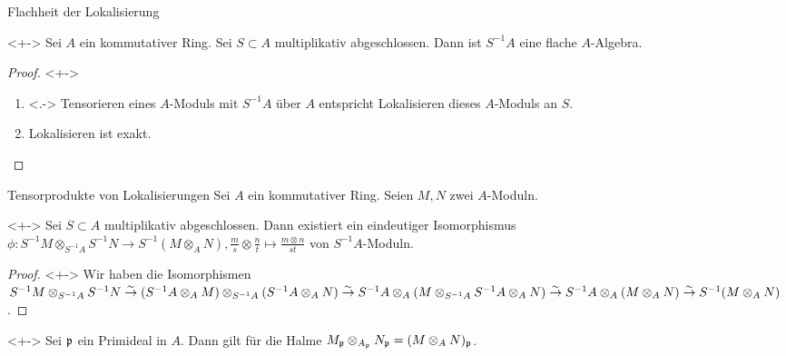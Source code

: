 \begin{frame}{Flachheit der Lokalisierung}
	\begin{proposition}<+->
		Sei \(A\) ein kommutativer Ring. Sei \(S \subset A\) multiplikativ abgeschlossen. Dann ist
		\(S^{-1} A\) eine flache \(A\)-Algebra.
	\end{proposition}
	\begin{proof}<+->
		\begin{enumerate}[<+->]
		\item<.->
			Tensorieren eines \(A\)-Moduls mit \(S^{-1} A\) über \(A\) entspricht Lokalisieren dieses \(A\)-Moduls an \(S\).
		\item
			Lokalisieren ist exakt.
			\qedhere
		\end{enumerate}
	\end{proof}
\end{frame}

\begin{frame}{Tensorprodukte von Lokalisierungen}
	Sei \(A\) ein kommutativer Ring. Seien \(M, N\) zwei \(A\)-Moduln. 
	\begin{proposition}<+->
		Sei \(S \subset A\) multiplikativ abgeschlossen. Dann existiert ein eindeutiger Isomorphismus
		\(\phi\colon S^{-1} M \otimes_{S^{-1} A} S^{-1} N \to S^{-1} (M \otimes_A N),
		\frac m s \otimes \frac n t \mapsto \frac{m \otimes n}{st}\)
		von \(S^{-1} A\)-Moduln.
	\end{proposition}
	\begin{proof}<+->
		Wir haben die Isomorphismen
		\(S^{-1} M \otimes_{S^{-1} A} S^{-1} N \stackrel\sim\to (S^{-1} A \otimes_A M) \otimes_{S^{-1} A} (S^{-1} A \otimes_A N)
		\stackrel\sim\to S^{-1} A \otimes_A (M \otimes_{S^{-1} A} S^{-1} A \otimes_A N)
		\stackrel\sim\to S^{-1} A \otimes_A (M \otimes_A N) \stackrel\sim\to S^{-1} (M \otimes_A N)\).
	\end{proof}
	\begin{example}<+->
		Sei \(\mathfrak{p}\) ein Primideal in \(A\). Dann gilt für die Halme \(M_{\mathfrak{p}} \otimes_{A_{\mathfrak{p}}}
		N_{\mathfrak{p}} = (M \otimes_A N)_{\mathfrak{p}}\).
	\end{example}
\end{frame}

